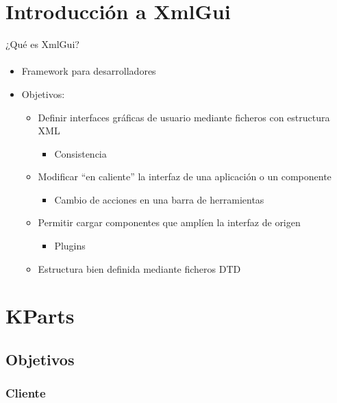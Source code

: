 \documentclass[12pt]{beamer}
\begin{document}
\section{Introducción a XmlGui}

\begin{frame}{¿Qué es XmlGui?}
  \framesubtitle{}
  \begin{itemize}
    \item Framework para desarrolladores
    \item Objetivos:
      \begin{itemize}
        \item Definir interfaces gráficas de usuario mediante ficheros con estructura XML
          \begin{itemize}
            \item Consistencia
          \end{itemize}
        \item Modificar ``en caliente'' la interfaz de una aplicación o un componente
          \begin{itemize}
            \item Cambio de acciones en una barra de herramientas
          \end{itemize}
        \item Permitir cargar componentes que amplíen la interfaz de origen
          \begin{itemize}
            \item Plugins
          \end{itemize}
        \item Estructura bien definida mediante ficheros DTD
      \end{itemize}
  \end{itemize}
\end{frame}


\section{KParts}

\subsection{Objetivos}

\subsubsection{Cliente}
\end{document}
